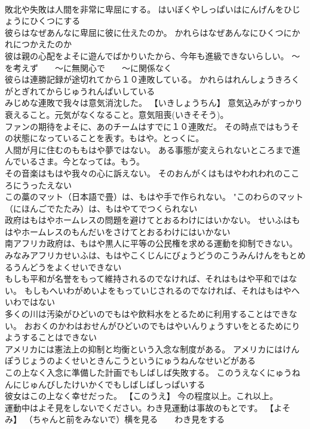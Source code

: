 \documentclass[8pt]{extreport}
\begin{document}
\begin{CJK}{UTF8}{min}
\\	敗北や失敗は人間を非常に卑屈にする。	はいぼくやしっぱいはにんげんをひじょうにひくつにする 
\\	彼らはなぜあんなに卑屈に彼に仕えたのか。	かれらはなぜあんなにひくつにかれにつかえたのか 
\\	彼は親の心配をよそに遊んでばかりいたから、今年も進級できないらしい。	～を考えず　　～に無関心で　　～に関係なく
\\	彼らは連勝記録が途切れてから１０連敗している。	かれらはれんしょうきろくがとぎれてからじゅうれんぱいしている 
\\	みじめな連敗で我々は意気消沈した。	【いきしょうちん】 意気込みがすっかり衰えること。元気がなくなること。意気阻喪(いきそそう)。
\\	ファンの期待をよそに、あのチームはすでに１０連敗だ。	その時点ではもうその状態になっていることを表す。もはや。とっくに。
\\	人間が月に住むのももはや夢ではない。	ある事態が変えられないところまで進んでいるさま。今となっては。もう。
\\	その音楽はもはや我々の心に訴えない。	そのおんがくはもはやわれわれのこころにうったえない 
\\	この藁のマット（日本語で畳）は、もはや手で作られない。	"このわらのマット（にほんごでたたみ）は、もはやてでつくられない 
\\	政府はもはやホームレスの問題を避けてとおるわけにはいかない。	せいふはもはやホームレスのもんだいをさけてとおるわけにはいかない 
\\	南アフリカ政府は、もはや黒人に平等の公民権を求める運動を抑制できない。	みなみアフリカせいふは、もはやこくじんにびょうどうのこうみんけんをもとめるうんどうをよくせいできない 
\\	もしも平和が名誉をもって維持されるのでなければ、それはもはや平和ではない。	もしもへいわがめいよをもっていじされるのでなければ、それはもはやへいわではない 
\\	多くの川は汚染がひどいのでもはや飲料水をとるために利用することはできない。	おおくのかわはおせんがひどいのでもはやいんりょうすいをとるためにりようすることはできない 
\\	アメリカには憲法上の抑制と均衡という入念な制度がある。	アメリカにはけんぽうじょうのよくせいときんこうというにゅうねんなせいどがある 
\\	この上なく入念に準備した計画でもしばしば失敗する。	このうえなくにゅうねんにじゅんびしたけいかくでもしばしばしっぱいする 
\\	彼女はこの上なく幸せだった。	【このうえ】 今の程度以上。これ以上。
\\	運動中はよそ見をしないでください。わき見運動は事故のもとです。	【よそみ】 （ちゃんと前をみないで）横を見る　　わき見をする

\end{CJK}
\end{document}
